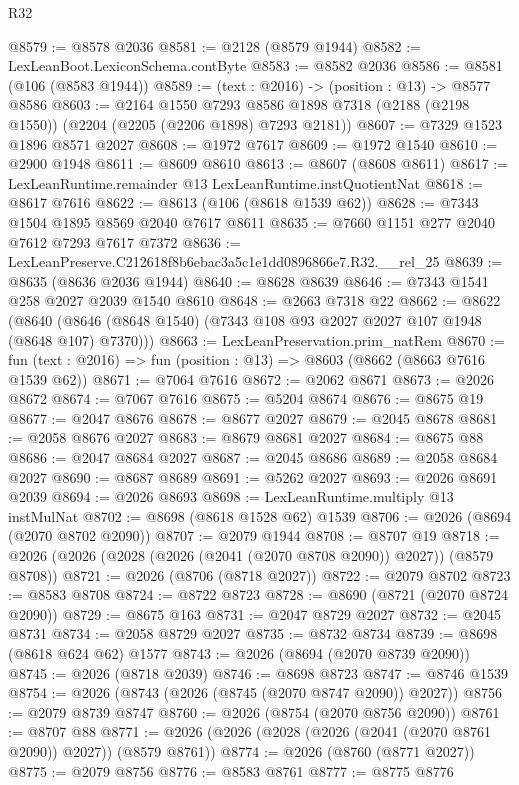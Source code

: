\begin{lexlean}{R32}
\begin{coremodule}
@8579 := @8578 @2036
@8581 := @2128 (@8579 @1944)
@8582 := LexLeanBoot.LexiconSchema.contByte
@8583 := @8582 @2036
@8586 := @8581 (@106 (@8583 @1944))
@8589 := (text : @2016) -> (position : @13) -> @8577 @8586
@8603 := @2164
    @1550
    @7293
    @8586
    @1898
    @7318
    (@2188 (@2198 @1550))
    (@2204 (@2205 (@2206 @1898) @7293 @2181))
@8607 := @7329 @1523 @1896 @8571 @2027
@8608 := @1972 @7617
@8609 := @1972 @1540
@8610 := @2900 @1948
@8611 := @8609 @8610
@8613 := @8607 (@8608 @8611)
@8617 := LexLeanRuntime.remainder @13 LexLeanRuntime.instQuotientNat
@8618 := @8617 @7616
@8622 := @8613 (@106 (@8618 @1539 @62))
@8628 := @7343 @1504 @1895 @8569 @2040 @7617 @8611
@8635 := @7660 @1151 @277 @2040 @7612 @7293 @7617 @7372
@8636 := LexLeanPreserve.C212618f8b6ebac3a5c1e1dd0896866e7.R32.__rel_25
@8639 := @8635 (@8636 @2036 @1944)
@8640 := @8628 @8639
@8646 := @7343 @1541 @258 @2027 @2039 @1540 @8610
@8648 := @2663 @7318 @22
@8662 := @8622
    (@8640 (@8646 (@8648 @1540) (@7343 @108 @93 @2027 @2027 @107 @1948 (@8648 @107) @7370)))
@8663 := LexLeanPreservation.prim_natRem
@8670 := fun (text : @2016) => fun (position : @13) => @8603 (@8662 (@8663 @7616 @1539 @62))
@8671 := @7064 @7616
@8672 := @2062 @8671
@8673 := @2026 @8672
@8674 := @7067 @7616
@8675 := @5204 @8674
@8676 := @8675 @19
@8677 := @2047 @8676
@8678 := @8677 @2027
@8679 := @2045 @8678
@8681 := @2058 @8676 @2027
@8683 := @8679 @8681 @2027
@8684 := @8675 @88
@8686 := @2047 @8684 @2027
@8687 := @2045 @8686
@8689 := @2058 @8684 @2027
@8690 := @8687 @8689
@8691 := @5262 @2027
@8693 := @2026 @8691 @2039
@8694 := @2026 @8693
@8698 := LexLeanRuntime.multiply @13 instMulNat
@8702 := @8698 (@8618 @1528 @62) @1539
@8706 := @2026 (@8694 (@2070 @8702 @2090))
@8707 := @2079 @1944
@8708 := @8707 @19
@8718 := @2026 (@2026 (@2028 (@2026 (@2041 (@2070 @8708 @2090)) @2027)) (@8579 @8708))
@8721 := @2026 (@8706 (@8718 @2027))
@8722 := @2079 @8702
@8723 := @8583 @8708
@8724 := @8722 @8723
@8728 := @8690 (@8721 (@2070 @8724 @2090))
@8729 := @8675 @163
@8731 := @2047 @8729 @2027
@8732 := @2045 @8731
@8734 := @2058 @8729 @2027
@8735 := @8732 @8734
@8739 := @8698 (@8618 @624 @62) @1577
@8743 := @2026 (@8694 (@2070 @8739 @2090))
@8745 := @2026 (@8718 @2039)
@8746 := @8698 @8723
@8747 := @8746 @1539
@8754 := @2026 (@8743 (@2026 (@8745 (@2070 @8747 @2090)) @2027))
@8756 := @2079 @8739 @8747
@8760 := @2026 (@8754 (@2070 @8756 @2090))
@8761 := @8707 @88
@8771 := @2026 (@2026 (@2028 (@2026 (@2041 (@2070 @8761 @2090)) @2027)) (@8579 @8761))
@8774 := @2026 (@8760 (@8771 @2027))
@8775 := @2079 @8756
@8776 := @8583 @8761
@8777 := @8775 @8776

\end{coremodule}
\end{lexlean}
